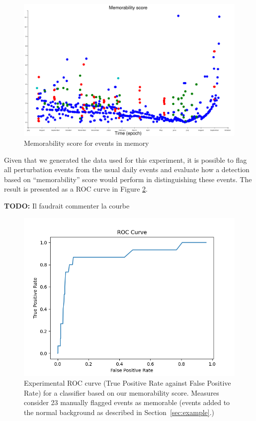 \documentclass[entropy,article,submit,moreauthors,pdftex]{Definitions/mdpi}
\begin{document}
\begin{figure}[ht]
    \centering
    \includegraphics[width=\linewidth]{figures/complexities_surprises}
    \caption{Memorability score for events in memory}
    \label{fig:result1}
\end{figure}

Given that we generated the data used for this experiment, it is possible to
flag all perturbation events from the usual daily events and evaluate how a
detection based on ``memorability'' score would perform in distinguishing these
events. The result is presented as a ROC curve in Figure \ref{fig:roc}.

\textbf{TODO:} Il faudrait commenter la courbe
\begin{figure}[ht]
    \centering
    \includegraphics[width=\linewidth]{./figures/roc}
    \caption{Experimental ROC curve (True Positive Rate against False Positive
        Rate) for a classifier based on our memorability score. Measures consider 23
        manually flagged events as memorable (events added to the normal background
        as described in Section~\ref{sec:example}.)}
    \label{fig:roc}
\end{figure}
\end{document}
